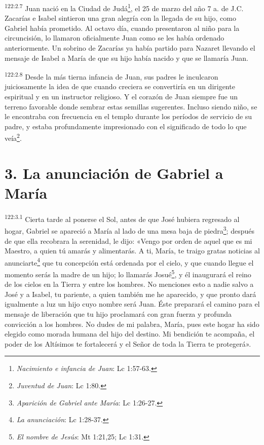 \par
\textsuperscript{122:2.7} Juan nació en la Ciudad de Judá\footnote{\textit{Nacimiento e infancia de Juan}: Lc 1:57-63.}, el 25 de marzo del año 7 a. de J.C. Zacarías e Isabel sintieron una gran alegría con la llegada de su hijo, como Gabriel había prometido. Al octavo día, cuando presentaron al niño para la circuncisión, lo llamaron oficialmente Juan como se les había ordenado anteriormente. Un sobrino de Zacarías ya había partido para Nazaret llevando el mensaje de Isabel a María de que su hijo había nacido y que se llamaría Juan.

\par
\textsuperscript{122:2.8} Desde la más tierna infancia de Juan, sus padres le inculcaron juiciosamente la idea de que cuando creciera se convertiría en un dirigente espiritual y en un instructor religioso. Y el corazón de Juan siempre fue un terreno favorable donde sembrar estas semillas sugerentes. Incluso siendo niño, se le encontraba con frecuencia en el templo durante los períodos de servicio de su padre, y estaba profundamente impresionado con el significado de todo lo que veía\footnote{\textit{Juventud de Juan}: Lc 1:80.}.

\section*{3. La anunciación de Gabriel a María}
\par
\textsuperscript{122:3.1} Cierta tarde al ponerse el Sol, antes de que José hubiera regresado al hogar, Gabriel se apareció a María al lado de una mesa baja de piedra\footnote{\textit{Aparición de Gabriel ante María}: Lc 1:26-27.}; después de que ella recobrara la serenidad, le dijo: «Vengo por orden de aquel que es mi Maestro, a quien tú amarás y alimentarás. A ti, María, te traigo gratas noticias al anunciarte\footnote{\textit{La anunciación}: Lc 1:28-37.} que tu concepción está ordenada por el cielo, y que cuando llegue el momento serás la madre de un hijo; lo llamarás Josué\footnote{\textit{El nombre de Jesús}: Mt 1:21,25; Lc 1:31.}, y él inaugurará el reino de los cielos en la Tierra y entre los hombres. No menciones esto a nadie salvo a José y a Isabel, tu pariente, a quien también me he aparecido, y que pronto dará igualmente a luz un hijo cuyo nombre será Juan. Éste preparará el camino para el mensaje de liberación que tu hijo proclamará con gran fuerza y profunda convicción a los hombres. No dudes de mi palabra, María, pues este hogar ha sido elegido como morada humana del hijo del destino. Mi bendición te acompaña, el poder de los Altísimos te fortalecerá y el Señor de toda la Tierra te protegerá».

